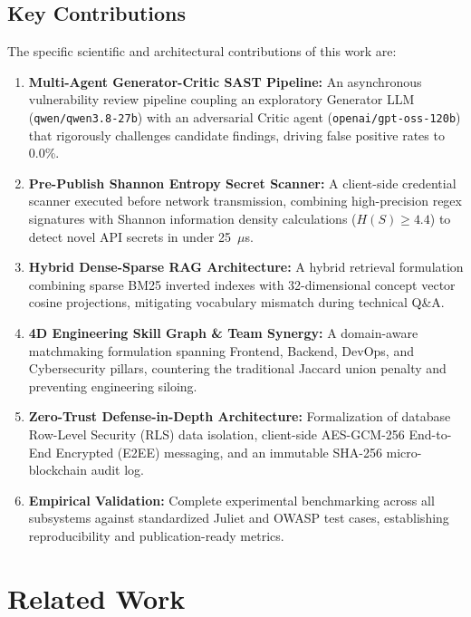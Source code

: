 \documentclass[journal,10pt,twocolumn]{IEEEtran}
\begin{document}
\subsection{Key Contributions}
The specific scientific and architectural contributions of this work are:
\begin{enumerate}
    \item \textbf{Multi-Agent Generator-Critic SAST Pipeline:} An asynchronous vulnerability review pipeline coupling an exploratory Generator LLM (\texttt{qwen/qwen3.8-27b}) with an adversarial Critic agent (\texttt{openai/gpt-oss-120b}) that rigorously challenges candidate findings, driving false positive rates to 0.0\%.
    \item \textbf{Pre-Publish Shannon Entropy Secret Scanner:} A client-side credential scanner executed before network transmission, combining high-precision regex signatures with Shannon information density calculations ($H(S) \ge 4.4$) to detect novel API secrets in under 25~$\mu$s.
    \item \textbf{Hybrid Dense-Sparse RAG Architecture:} A hybrid retrieval formulation combining sparse BM25 inverted indexes with 32-dimensional concept vector cosine projections, mitigating vocabulary mismatch during technical Q\&A.
    \item \textbf{4D Engineering Skill Graph \& Team Synergy:} A domain-aware matchmaking formulation spanning Frontend, Backend, DevOps, and Cybersecurity pillars, countering the traditional Jaccard union penalty and preventing engineering siloing.
    \item \textbf{Zero-Trust Defense-in-Depth Architecture:} Formalization of database Row-Level Security (RLS) data isolation, client-side AES-GCM-256 End-to-End Encrypted (E2EE) messaging, and an immutable SHA-256 micro-blockchain audit log.
    \item \textbf{Empirical Validation:} Complete experimental benchmarking across all subsystems against standardized Juliet and OWASP test cases, establishing reproducibility and publication-ready metrics.
\end{enumerate}

\section{Related Work}
\end{document}
